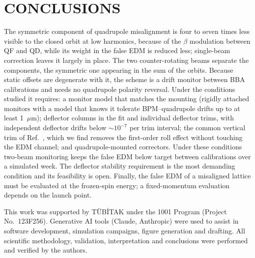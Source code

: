 \documentclass[aps,prab,reprint,superscriptaddress,nofootinbib]{revtex4-2}
\newif\iftodo
\newcommand{\todo}[1]{\iftodo{\color{red}\textbf{TODO:} #1}\fi}
\begin{document}
\section{CONCLUSIONS}
\label{sec:conclusion}
The symmetric component of quadrupole misalignment is four to seven times less visible to the closed orbit at
low harmonics, because of the $\beta$ modulation between QF and QD, while its weight in the false EDM is reduced
less; single-beam correction leaves it largely in place. The two counter-rotating beams separate the components,
the symmetric one appearing in the sum of the orbits. Because static offsets are degenerate with it, the scheme
is a drift monitor between BBA calibrations and needs no quadrupole polarity reversal. Under the conditions
studied it requires: a monitor model that matches the mounting (rigidly attached monitors with a model that
knows it tolerate BPM--quadrupole drifts up to at least 1~$\mu$m); deflector columns in the fit and individual
deflector trims, with independent deflector drifts below $\sim10^{-7}$ per trim interval; the common vertical
trim of Ref.~\cite{omarov}, which we find removes the first-order roll effect without touching the EDM channel; and
quadrupole-mounted correctors. Under these conditions two-beam monitoring keeps the false EDM below target
between calibrations over a simulated week. The deflector stability requirement is the most demanding condition
and its feasibility is open. Finally, the false EDM of a misaligned lattice must be evaluated at
the frozen-spin energy; a fixed-momentum evaluation depends on the launch point.

\begin{acknowledgments}
This work was supported by T\"UB\.ITAK under the 1001 Program (Project No.~123F256).
Generative AI tools (Claude, Anthropic) were used to assist in software development, simulation campaigns,
figure generation and drafting. All scientific methodology, validation, interpretation and conclusions were
performed and verified by the authors.
\todo{Authors to confirm the AI-use statement.}
\end{acknowledgments}

\appendix
\end{document}
